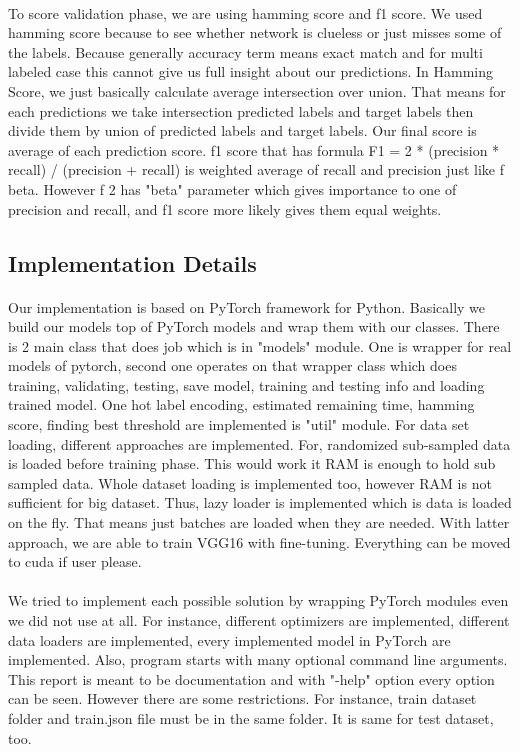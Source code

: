 \paragraph{}To score validation phase, we are using hamming score and f1 score. We used hamming score because to see whether network is clueless or just misses some of the labels. Because generally accuracy term means exact match and for multi labeled case this cannot give us full insight about our predictions. In Hamming Score, we just basically calculate average intersection over union. That means for each predictions we take intersection predicted labels and target labels then divide them by union of predicted labels and target labels. Our final score is average of each prediction score. f1 score that has formula F1 = 2 * (precision * recall) / (precision + recall) is weighted average of recall and precision just like f beta. However f 2 has "beta" parameter which gives importance to one of precision and recall, and f1 score more likely gives them equal weights. 
\subsection{Implementation Details}
\paragraph{}Our implementation is based on PyTorch framework for Python. Basically we build our models top of PyTorch models and wrap them with our classes. There is 2 main class that does job which is in "models" module. One is wrapper for real models of pytorch, second one operates on that wrapper class which does training, validating, testing, save model, training and testing info and loading trained model. One hot label encoding, estimated remaining time, hamming score, finding best threshold are implemented is "util" module. For data set loading, different approaches are implemented. For, randomized sub-sampled data is loaded before training phase. This would work it RAM is enough to hold sub sampled data. Whole dataset loading is implemented too, however RAM is not sufficient for big dataset. Thus, lazy loader is implemented which is data is loaded on the fly. That means just batches are loaded when they are needed. With latter approach, we are able to train VGG16 with fine-tuning. Everything can be moved to cuda if user please.
\paragraph{} We tried to implement each possible solution by wrapping PyTorch modules even we did not use at all. For instance, different optimizers are implemented, different data loaders are implemented, every implemented model in PyTorch are implemented. Also, program starts with many optional command line arguments. This report is meant to be documentation and with "-help" option every option can be seen. However there are some restrictions. For instance, train dataset folder and train.json file must be in the same folder. It is same for test dataset, too. 

